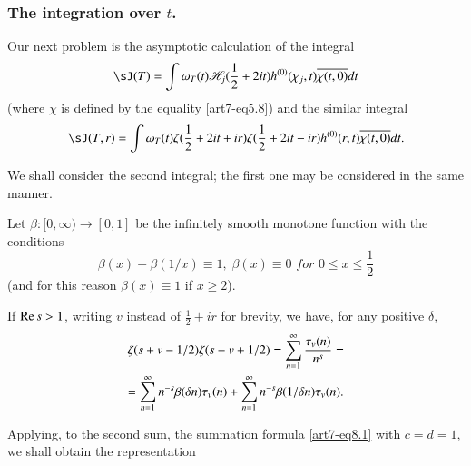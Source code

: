\subsubsection{The integration over $t$.}\label{art7-subsubsec2.7.2}
Our next problem is the asymptotic calculation of the integral
\begin{equation}
\sJ (T) = \int \omega_T (t) \sH_j (\frac{1}{2} + 2 it) h^{(0)} (\chi_j, t) \overline{\chi (t, 0)} dt \label{art7-eq8.3}
\end{equation}
(where $\chi$ is defined by the equality \eqref{art7-eq5.8}) and the similar integral 
\begin{equation}
\sJ (T, r) = \int \omega_T (t) \zeta (\frac{1}{2} + 2 it + ir) \zeta (\frac{1}{2} + 2 i t - ir) h^{(0)} (r,t) \overline{\chi (t,0)} dt. 
\label{art7-eq8.4}
\end{equation}

We shall consider the second integral; the first one may be considered in the same manner. 

Let $\beta : [0, \infty) \to [0,1]$ be the infinitely smooth monotone function with the conditions
\begin{equation}
\beta(x) + \beta (1/x) \equiv 1, \; \beta (x) \equiv 0 \textit{ for  } 0 \leqslant x \leqslant \frac{1}{2}
\label{art7-eq8.5}
\end{equation}
(and for this reason $\beta (x) \equiv 1$ if $x \geqslant 2$).

If $\operatorname{Re} s >1$, writing $v$ instead of $\frac{1}{2} + ir $ for brevity, we have, for any positive $\delta$, 
\begin{gather}
\zeta (s + v - 1/2) \zeta (s- v+ 1/2) = \sum\limits^\infty_{n=1} \frac{\tau_v (n)}{n^s} = \label{art7-eq8.6}\\
= \sum\limits^\infty_{n=1} n^{-s} \beta (\delta n) \tau_v (n) + \sum\limits^\infty_{n=1} n^{-s} \beta (1/\delta n) \tau_v (n). \notag
\end{gather}
 
Applying, to the second sum, the summation formula \eqref{art7-eq8.1} with $c = d =1$, we shall obtain the representation 



